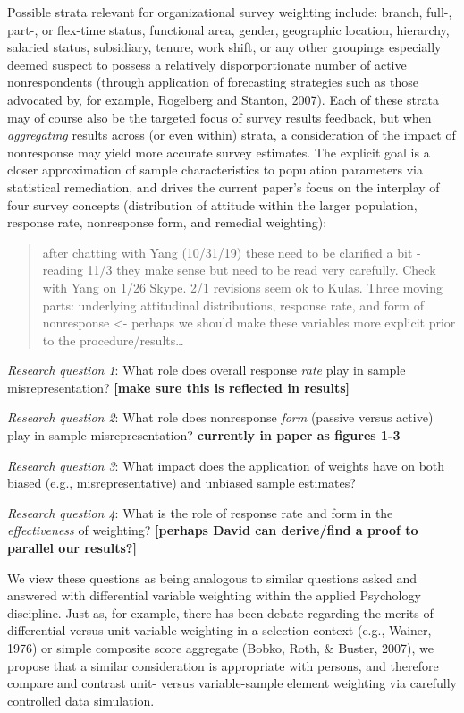 \documentclass[
  ,man,floatsintext]{apa6}
\begin{document}
Possible strata relevant for organizational survey weighting include: branch, full-, part-, or flex-time status, functional area, gender, geographic location, hierarchy, salaried status, subsidiary, tenure, work shift, or any other groupings especially deemed suspect to possess a relatively disporportionate number of active nonrespondents (through application of forecasting strategies such as those advocated by, for example, Rogelberg and Stanton, 2007). Each of these strata may of course also be the targeted focus of survey results feedback, but when \emph{aggregating} results across (or even within) strata, a consideration of the impact of nonresponse may yield more accurate survey estimates. The explicit goal is a closer approximation of sample characteristics to population parameters via statistical remediation, and drives the current paper's focus on the interplay of four survey concepts (distribution of attitude within the larger population, response rate, nonresponse form, and remedial weighting):

\begin{quote}
after chatting with Yang (10/31/19) these need to be clarified a bit - reading 11/3 they make sense but need to be read very carefully. Check with Yang on 1/26 Skype. 2/1 revisions seem ok to Kulas. Three moving parts: underlying attitudinal distributions, response rate, and form of nonresponse \textless- perhaps we should make these variables more explicit prior to the procedure/results\ldots{}
\end{quote}

\emph{Research question 1}: What role does overall response \emph{rate} play in sample misrepresentation? \textbf{{[}make sure this is reflected in results{]}}

\emph{Research question 2}: What role does nonresponse \emph{form} (passive versus active) play in sample misrepresentation? \textbf{currently in paper as figures 1-3}

\emph{Research question 3}: What impact does the application of weights have on both biased (e.g., misrepresentative) and unbiased sample estimates?

\emph{Research question 4}: What is the role of response rate and form in the \emph{effectiveness} of weighting? \textbf{{[}perhaps David can derive/find a proof to parallel our results?{]}}

We view these questions as being analogous to similar questions asked and answered with differential variable weighting within the applied Psychology discipline. Just as, for example, there has been debate regarding the merits of differential versus unit variable weighting in a selection context (e.g., Wainer, 1976) or simple composite score aggregate (Bobko, Roth, \& Buster, 2007), we propose that a similar consideration is appropriate with persons, and therefore compare and contrast unit- versus variable-sample element weighting via carefully controlled data simulation.
\end{document}
